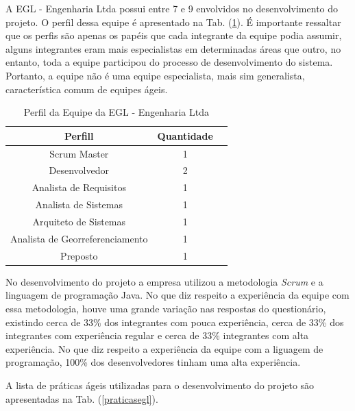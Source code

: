 A EGL - Engenharia Ltda possui entre 7 e 9 envolvidos no desenvolvimento do projeto.  O perfil dessa equipe é apresentado na Tab. (\ref{pegl}). É importante ressaltar que os perfis são apenas os papéis que cada integrante da equipe podia assumir, alguns integrantes eram mais especialistas em determinadas áreas que outro, no entanto, toda a equipe participou do processo de desenvolvimento do sistema. Portanto, a equipe não é uma equipe especialista, mais sim generalista, característica comum de equipes ágeis.

\begin{table}[H]
\center
\footnotesize
\begin{tabular}{|c|c|c|}
\hline
\textbf{Perfill}          & \textbf{Quantidade}  \\ \hline
Scrum Master               &  1                  \\ \hline
Desenvolvedor       &  2               \\ \hline
Analista de Requisitos              &   1                \\ \hline
Analista de Sistemas            &   1              \\ \hline
Arquiteto de Sistemas           &  1               \\ \hline
Analista de Georreferenciamento             &  1               \\ \hline
Preposto   &  1               \\ \hline
\end{tabular}
\caption{Perfil da Equipe da EGL - Engenharia Ltda}
\label{pegl}
\end{table}


No desenvolvimento do projeto a empresa utilizou a metodologia \textit{Scrum} e a linguagem de programação Java. No que diz respeito a experiência da equipe com essa metodologia, houve uma grande variação nas respostas do questionário, existindo cerca de 33\%  dos integrantes com pouca experiência, cerca de 33\% dos integrantes com experiência regular e cerca de 33\% integrantes com alta experiência. No que diz respeito a experiência da equipe com a liguagem de programação, 100\% dos desenvolvedores tinham uma alta experiência.

A lista de práticas ágeis utilizadas para o desenvolvimento do projeto são apresentadas na Tab. (\ref{praticasegl}).

